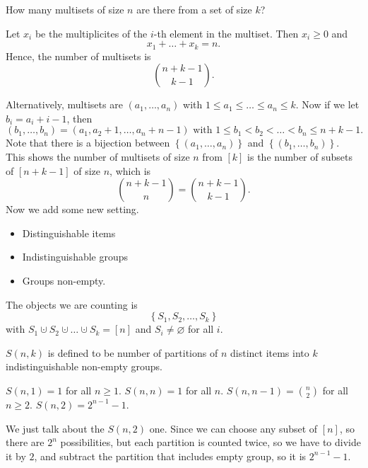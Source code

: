 \begin{eg}
    How many multisets of size \(n\) are there from a set of size \(k\)?  
\end{eg}
\begin{explanation}
    Let \(x_i\) be the multiplicites of the \(i\)-th element in the multiset. Then \(x_i \ge 0\) and 
    \[
        x_1 + \dots + x_k = n.
    \]   
    Hence, the number of multisets is 
    \[
        \binom{n + k - 1}{k - 1}.
    \]
\end{explanation}

Alternatively, multisets are \((a_1, \dots , a_n)\) with \(1 \le a_1 \le \dots \le a_n \le k\). Now if we let \(b_i = a_i + i - 1\), then 
\[
    (b_1, \dots , b_n) = (a_1, a_2 + 1, \dots , a_n + n - 1) \text{ with } 1 \le b_1 < b_2 < \dots < b_n \le n + k - 1.
\]   Note that there is a bijection between \(\left\{ (a_1, \dots , a_n) \right\} \) and \(\left\{ (b_1, \dots , b_n) \right\} \). This shows the number of multisets of size \(n\) from \([k]\) is the number of subsets of \([n + k - 1]\) of size \(n\), which is 
\[
    \binom{n + k - 1}{n} = \binom{n + k - 1}{k - 1}.
\]      
Now we add some new setting. 
\begin{itemize}
    \item Distinguishable items 
    \item Indistinguishable groups 
    \item Groups non-empty.
\end{itemize}
The objects we are counting is 
\[
    \left\{ S_1, S_2, \dots , S_k \right\} 
\] with \(S_1 \cupdot S_2 \cupdot \dots \cupdot S_k = [n]\) and \(S_i \neq \varnothing \) for all \(i\). 

\begin{definition} \label{def: stirling num second kind}
\(S(n,k)\) is defined to be number of partitions of \(n\) distinct items into \(k\) indistinguishable non-empty groups.
\end{definition}

\begin{eg}
    \(S(n, 1) = 1\) for all \(n \ge 1\). \(S(n, n) = 1\) for all \(n\). \(S(n, n-1) = \binom{n}{2}\) for all \(n \ge 2\). \(S(n, 2) = 2^{n-1} - 1\).       
\end{eg}
\begin{explanation}
    We just talk about the \(S(n, 2)\) one. Since we can choose any subset of \([n]\), so there are \(2^n\) possibilities, but each partition is counted twice, so we have to divide it by \(2\), and subtract the partition that includes empty group, so it is \(2^{n-1} - 1\).    
\end{explanation}

